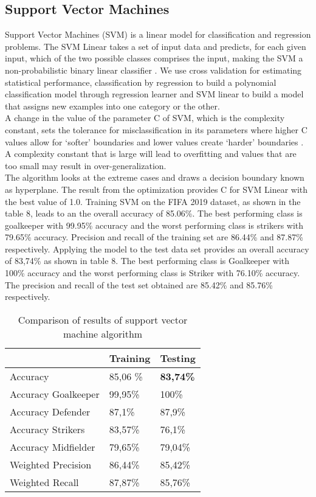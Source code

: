 \subsection{Support Vector Machines}
Support Vector Machines (SVM) is a linear model for classification and regression problems. The SVM Linear takes a set of input data and predicts, for each given input, which of the two possible classes comprises the input, making the SVM a non-probabilistic binary linear classifier \cite{ref_rapidminersvm}.
We use cross validation for estimating statistical performance, classification by regression to build a polynomial classification model through regression learner and SVM linear to build a model that assigns new examples into one category or the other.\\
 A change in the value of the parameter C of SVM, which is the complexity constant, sets the tolerance for misclassification in its parameters where higher C values allow for `softer' boundaries and lower values create `harder' boundaries \cite{ref_rapidminersvm}.  A complexity constant that is large will lead to overfitting and values that are too small may result in over-generalization.\\
The algorithm looks at the extreme cases and draws a decision boundary known as hyperplane. The result from the optimization provides C for SVM Linear with the best value of 1.0. 
Training SVM on the FIFA 2019 dataset, as shown in the table 8, leads to an the overall accuracy of 85.06\%. The best performing class is goalkeeper with 99.95\% accuracy and the worst performing class is strikers with 79.65\% accuracy. Precision and recall of the training set are 86.44\% and 87.87\% respectively. 
Applying the model to the test data set provides an overall accuracy of 83,74\% as shown in table 8. The best performing class is Goalkeeper with 100\% accuracy and the worst performing class is Striker with 76.10\% accuracy. The precision and recall of the test set obtained are 85.42\% and 85.76\% respectively. 

\begin{table}[]
\centering
\begin{tabular}{@{}l|ll@{}}
\toprule
                    & Training & Testing \\ \midrule
Accuracy            & 85,06 \% & \textbf{83,74\%} \\ \midrule
Accuracy Goalkeeper & 99,95\%  & 100\%   \\
Accuracy Defender   & 87,1\%   & 87,9\%  \\
Accuracy Strikers   & 83,57\%  & 76,1\%  \\
Accuracy Midfielder & 79,65\%  & 79,04\% \\ \midrule
Weighted Precision  & 86,44\%  & 85,42\% \\
Weighted Recall     & 87,87\%  & 85,76\% \\ \bottomrule
\end{tabular}
\label{Tab:SVM}
\caption{Comparison of results of support vector machine algorithm}
\end{table}
